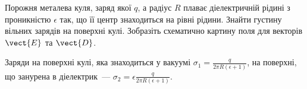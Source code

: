 \begin{problem}
	Порожня металева куля, заряд якої $q$, а радіус $R$ плаває діелектричній рідині з проникністю $\epsilon$ так, що її центр знаходиться на рівні рідини. Знайти густину вільних зарядів на поверхні кулі.  Зобразіть схематично картину поля для векторів $\vect{E}$ та $\vect{D}$.
	\begin{solution}
		Заряди на поверхні кулі, яка знаходиться у вакуумі $\sigma_1 = \frac{q}{2\pi R (\epsilon + 1)}$, на поверхні, що занурена в діелектрик~--- $\sigma_2 = \epsilon \frac{q}{2\pi R (\epsilon + 1)}$.
		\begin{center}
			\begin{minipage}[t]{0.45\linewidth}\centering
				\label{}
			\end{minipage}
			\begin{minipage}[t]{0.45\linewidth}\centering
			\end{minipage}
		\end{center}
	\end{solution}
\end{problem}


